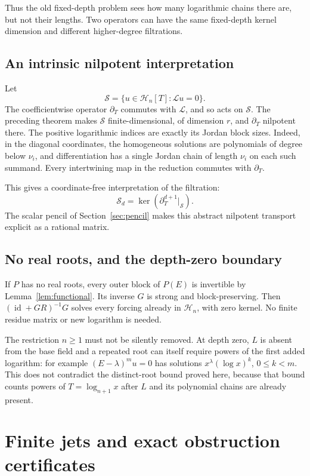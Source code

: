 \documentclass[11pt,a4paper]{article}
\numberwithin{equation}{section}
\theoremstyle{definition}
\theoremstyle{remark}
\theoremstyle{definition}
\newcommand{\Hh}{\mathcal H}
\newcommand{\Ll}{\mathcal L}
\newcommand{\Id}{\operatorname{id}}
\begin{document}
Thus the old fixed-depth problem sees how many logarithmic chains there are, but not their lengths. Two operators can have the same fixed-depth kernel dimension and different higher-degree filtrations.

\subsection{An intrinsic nilpotent interpretation}
Let
\[
 \mathscr S=\{u\in\Hh_n[T]:\Ll u=0\}.
\]
The coefficientwise operator $\partial_T$ commutes with $\Ll$, and so acts on $\mathscr S$. The preceding theorem makes $\mathscr S$ finite-dimensional, of dimension $r$, and $\partial_T$ nilpotent there. The positive logarithmic indices are exactly its Jordan block sizes. Indeed, in the diagonal coordinates, the homogeneous solutions are polynomials of degree below $\nu_i$, and differentiation has a single Jordan chain of length $\nu_i$ on each such summand. Every intertwining map in the reduction commutes with $\partial_T$.

This gives a coordinate-free interpretation of the filtration:
\begin{equation}
 \mathscr S_d=\ker(\partial_T^{d+1}|_{\mathscr S}).
 \label{eq:nilpotent-intrinsic}
\end{equation}
The scalar pencil of Section~\ref{sec:pencil} makes this abstract nilpotent transport explicit as a rational matrix.

\subsection{No real roots, and the depth-zero boundary}
If $P$ has no real roots, every outer block of $P(E)$ is invertible by Lemma~\ref{lem:functional}. Its inverse $G$ is strong and block-preserving. Then $(\Id+GR)^{-1}G$ solves every forcing already in $\Hh_n$, with zero kernel. No finite residue matrix or new logarithm is needed.

The restriction $n\ge1$ must not be silently removed. At depth zero, $L$ is absent from the base field and a repeated root can itself require powers of the first added logarithm: for example $(E-\lambda)^m u=0$ has solutions $x^\lambda(\log x)^k$, $0\le k<m$. This does not contradict the distinct-root bound proved here, because that bound counts powers of $T=\log_{n+1}x$ after $L$ and its polynomial chains are already present.

\section{Finite jets and exact obstruction certificates}
\label{sec:algorithm}
\end{document}
